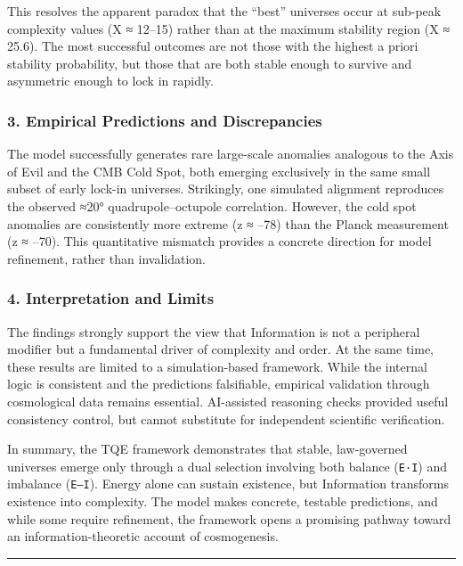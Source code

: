 This resolves the apparent paradox that the ``best'' universes occur at
sub-peak complexity values (X ≈ 12--15) rather than at the maximum
stability region (X ≈ 25.6). The most successful outcomes are not those
with the highest a priori stability probability, but those that are both
stable enough to survive and asymmetric enough to lock in rapidly.

\subsubsection{3. Empirical Predictions and
Discrepancies}\label{empirical-predictions-and-discrepancies}

The model successfully generates rare large-scale anomalies analogous to
the Axis of Evil and the CMB Cold Spot, both emerging exclusively in the
same small subset of early lock-in universes. Strikingly, one simulated
alignment reproduces the observed ≈20° quadrupole--octupole correlation.
However, the cold spot anomalies are consistently more extreme (z ≈
--78) than the Planck measurement (z ≈ --70). This quantitative mismatch
provides a concrete direction for model refinement, rather than
invalidation.

\subsubsection{4. Interpretation and
Limits}\label{interpretation-and-limits}

The findings strongly support the view that Information is not a
peripheral modifier but a fundamental driver of complexity and order. At
the same time, these results are limited to a simulation-based
framework. While the internal logic is consistent and the predictions
falsifiable, empirical validation through cosmological data remains
essential. AI-assisted reasoning checks provided useful consistency
control, but cannot substitute for independent scientific verification.

In summary, the TQE framework demonstrates that stable, law-governed
universes emerge only through a dual selection involving both balance
(\texttt{E·I}) and imbalance (\texttt{\textbar{}E–I\textbar{}}). Energy
alone can sustain existence, but Information transforms existence into
complexity. The model makes concrete, testable predictions, and while
some require refinement, the framework opens a promising pathway toward
an information-theoretic account of cosmogenesis.

\begin{center}\rule{0.5\linewidth}{0.5pt}\end{center}

